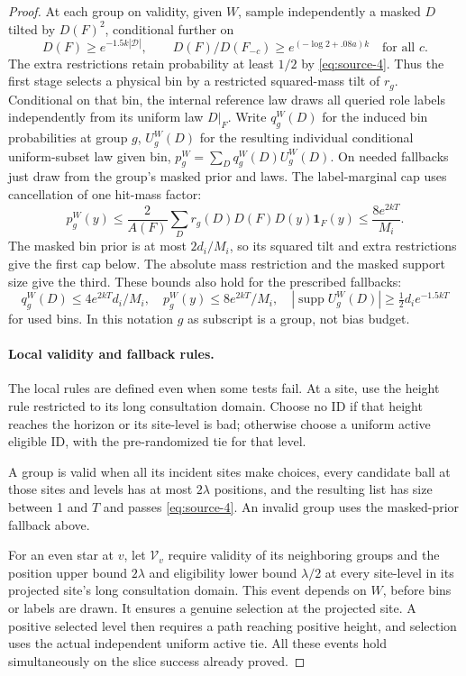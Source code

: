 \begin{proof}
At each group on validity, given \(W\), sample independently a masked \(D\) tilted by \(D(F)^2\), conditional further on
\[
 D(F)\ge e^{-1.5k|\mathcal D|},\qquad
 D(F)/D(F_{-c})\ge e^{(-\log2+.08a)k}\quad\text{for all }c .
\]
The extra restrictions retain probability at least \(1/2\) by \eqref{eq:source-4}. Thus the first stage selects a physical bin by a restricted squared-mass tilt of \(r_g\). Conditional on that bin, the internal reference law draws all queried role labels independently from its uniform law \(D|_F\). Write \(q_g^W(D)\) for the induced bin probabilities at group \(g\), \(U_g^W(D)\) for the resulting individual conditional uniform-subset law given bin, \(p_g^W=\sum_D q_g^W(D) U_g^W(D)\). On needed fallbacks just draw from the group's masked prior and laws. The label-marginal cap uses cancellation of one hit-mass factor:
\[
 p_g^W(y)\le\frac{2}{A(F)}\sum_D r_g(D)D(F)D(y)\mathbf1_F(y)
       \le\frac{8e^{2kT}}{M_i}.
\]
The masked bin prior is at most \(2d_i/M_i\), so its squared tilt and extra restrictions give the first cap below. The absolute mass restriction and the masked support size give the third. These bounds also hold for the prescribed fallbacks:
\begin{equation}
 q_g^W(D)\le 4e^{2kT} d_i/M_i,\quad p_g^W(y)\le 8e^{2kT}/M_i,\quad
 |\operatorname{supp} U_g^W(D)|\ge \tfrac12 d_i e^{-1.5kT}
 \label{eq:source-13}
\end{equation}
for used bins. In this notation \(g\) as subscript is a group, not bias budget.

\paragraph{Local validity and fallback rules.}
The local rules are defined even when some tests fail. At a site, use the height rule restricted to its long consultation domain. Choose no ID if that height reaches the horizon or its site-level is bad; otherwise choose a uniform active eligible ID, with the pre-randomized tie for that level.

A group is valid when all its incident sites make choices, every candidate ball at those sites and levels has at most \(2\lambda\) positions, and the resulting list has size between 1 and \(T\) and passes \eqref{eq:source-4}. An invalid group uses the masked-prior fallback above.

For an even star at \(v\), let \(\mathcal V_v\) require validity of its neighboring groups and the position upper bound \(2\lambda\) and eligibility lower bound \(\lambda/2\) at every site-level in its projected site's long consultation domain. This event depends on \(W\), before bins or labels are drawn. It ensures a genuine selection at the projected site. A positive selected level then requires a path reaching positive height, and selection uses the actual independent uniform active tie. All these events hold simultaneously on the slice success already proved.


\end{proof}

